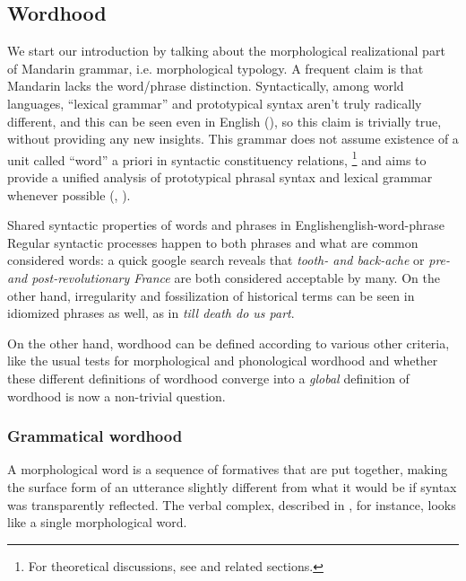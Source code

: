 \documentclass[UTF8, a4paper, oneside, scheme=plain, 12pt]{ctexrep}
\newcommand{\form}[1]{\emph{#1}}
\begin{document}
\subsection{Wordhood}\label{sec:grammatical.wordhood}

We start our introduction by talking about the morphological realizational part of Mandarin grammar,
i.e. morphological typology.
A frequent claim is that Mandarin lacks the word/phrase distinction.
Syntactically, among world languages,
``lexical grammar'' and prototypical syntax aren't truly radically different,
and this can be seen even in English (),
so this claim is trivially true, without providing any new insights.
This grammar does not assume existence of a unit called ``word'' a priori in syntactic constituency relations,%
\footnote{
    For theoretical discussions, see  and related sections.
}
and aims to provide a unified analysis of prototypical phrasal syntax
and lexical grammar whenever possible
(, ).

\begin{theorybox}{Shared syntactic properties of words and phrases in English}{english-word-phrase}
    Regular syntactic processes happen to both phrases and what are common considered words:
    a quick google search reveals that \form{tooth- and back-ache}
    or \form{pre- and post-revolutionary France} are both considered acceptable by many.
    On the other hand, irregularity and fossilization of historical terms
    can be seen in idiomized phrases as well, as in \form{till death do us part}.
\end{theorybox}

On the other hand, wordhood can be defined according to various other criteria,
like the usual tests for morphological and phonological wordhood
and whether these different definitions of wordhood converge into a \emph{global} definition of wordhood
is now a non-trivial question.

\subsubsection{Grammatical wordhood}\label{sec:grammatical.wordhood.grammatical-word}

A morphological word is a sequence of formatives that are put together,
making the surface form of an utterance slightly different from what it would be if syntax was transparently reflected.
The verbal complex, described in ,
for instance, looks like a single morphological word.
\end{document}
